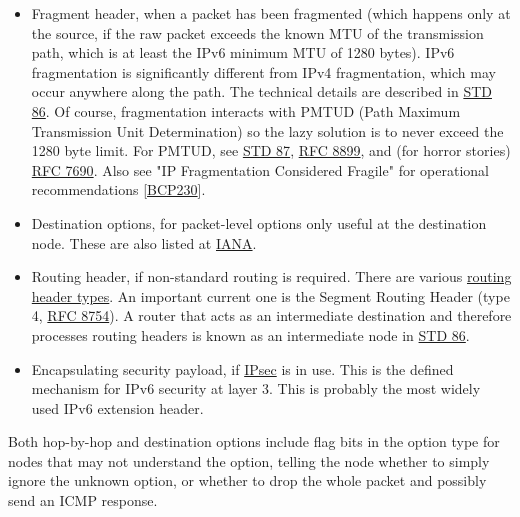 \documentclass[
]{article}
\begin{document}
\begin{itemize}
  More generally, \href{https://www.rfc-editor.org/info/rfc8200}{RFC
  8200} states that "it is now expected that nodes along a
  packet\textquotesingle s delivery path only examine and process the
  Hop-by-Hop Options header if explicitly configured to do so." Some
  mitigations of this problem are described in
  \href{https://www.rfc-editor.org/info/rfc9673}{RFC 9673}.
\item
  Fragment header, when a packet has been fragmented (which happens only
  at the source, if the raw packet exceeds the known MTU of the
  transmission path, which is at least the IPv6 minimum MTU of 1280
  bytes). IPv6 fragmentation is significantly different from IPv4
  fragmentation, which may occur anywhere along the path. The technical
  details are described in
  \href{https://www.rfc-editor.org/info/std86}{STD 86}. Of course,
  fragmentation interacts with PMTUD (Path Maximum Transmission Unit
  Determination) so the lazy solution is to never exceed the 1280 byte
  limit. For PMTUD, see \href{https://www.rfc-editor.org/info/std87}{STD
  87}, \href{https://www.rfc-editor.org/info/rfc8899}{RFC 8899}, and
  (for horror stories)
  \href{https://www.rfc-editor.org/info/rfc7690}{RFC 7690}. Also see "IP
  Fragmentation Considered Fragile" for operational recommendations
  {[}\href{https://www.rfc-editor.org/info/bcp230}{BCP230}{]}.
\item
  Destination options, for packet-level options only useful at the
  destination node. These are also listed at
  \href{https://www.iana.org/assignments/ipv6-parameters/ipv6-parameters.xhtml\#ipv6-parameters-2}{IANA}.
\item
  Routing header, if non-standard routing is required. There are various
  \href{https://www.iana.org/assignments/ipv6-parameters/ipv6-parameters.xhtml\#ipv6-parameters-2}{routing
  header types}. An important current one is the Segment Routing Header
  (type 4, \href{https://www.rfc-editor.org/info/rfc8754}{RFC 8754}). A
  router that acts as an intermediate destination and therefore
  processes routing headers is known as an \textquotesingle intermediate
  node\textquotesingle{} in
  \href{https://www.rfc-editor.org/info/std86}{STD 86}.
\item
  Encapsulating security payload, if
  \href{https://www.rfc-editor.org/info/rfc4303}{IPsec} is in use. This
  is the defined mechanism for IPv6 security at layer 3. This is
  probably the most widely used IPv6 extension header.
\end{itemize}

Both hop-by-hop and destination options include flag bits in the option
type for nodes that may not understand the option, telling the node
whether to simply ignore the unknown option, or whether to drop the
whole packet and possibly send an ICMP response.
\end{document}
